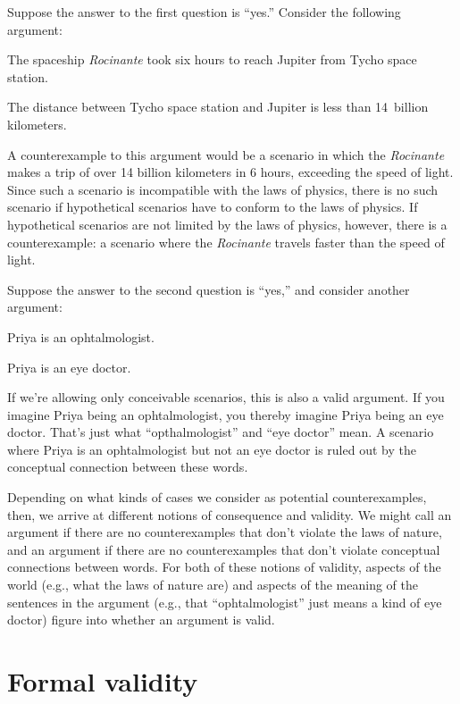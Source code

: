 Suppose the answer to the first question is ``yes.'' Consider the following argument:
	\begin{earg}
		\item[] The spaceship \emph{Rocinante} took six hours to reach Jupiter from Tycho space station.
		\item[\therefore] The distance between Tycho space station and Jupiter is less than 14~billion kilometers.
	\end{earg}
A counterexample to this argument would be a scenario in which the \emph{Rocinante} makes a trip of over 14 billion kilometers in 6 hours, exceeding the speed of light. Since such a scenario is incompatible with the laws of physics, there is no such scenario if hypothetical scenarios have to conform to the laws of physics.  If hypothetical scenarios are not limited by the laws of physics, however, there is a counterexample: a scenario where the \emph{Rocinante} travels faster than the speed of light. 

Suppose the answer to the second question is ``yes,'' and consider another argument:
	\begin{earg}
		\item[] Priya is an ophtalmologist.
		\item[\therefore] Priya is an eye doctor.
	\end{earg}
If we're allowing only conceivable scenarios, this is also a valid argument. If you imagine Priya being an ophtalmologist, you thereby imagine Priya being an eye doctor. That's just what ``opthalmologist'' and ``eye doctor'' mean.  A scenario where Priya is an ophtalmologist but not an eye doctor is ruled out by the conceptual connection between these words.

Depending on what kinds of cases we consider as potential counterexamples, then, we arrive at different notions of consequence and validity. We might call an argument  if there are no counterexamples that don't violate the laws of nature, and an argument  if there are no counterexamples that don't violate conceptual connections between words.
For both of these notions of validity, aspects of the world (e.g., what the laws of nature are) and aspects of the meaning of the sentences in the argument (e.g., that ``ophtalmologist'' just means a kind of eye doctor) figure into whether an argument is valid.

\section{Formal validity}

